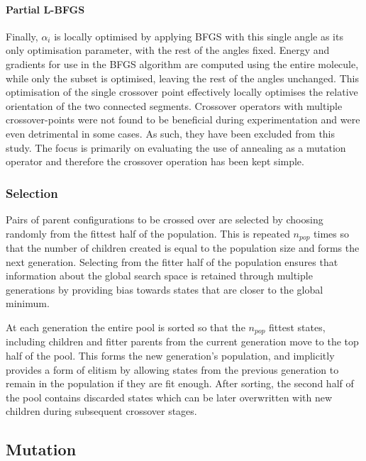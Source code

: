 \documentclass{article}
\begin{document}
\paragraph{Partial L-BFGS}

Finally, $\alpha_i$ is locally optimised by applying BFGS with this single angle
as its only optimisation parameter, with the rest of the angles fixed. Energy
and gradients for use in the BFGS algorithm are computed using the entire
molecule, while only the subset is optimised, leaving the rest of the angles
unchanged. This optimisation of the single crossover point effectively locally
optimises the relative orientation of the two connected segments.
Crossover operators with multiple crossover-points were not found to be
beneficial during experimentation and were even detrimental in some cases. As
such, they have been excluded from this study. The focus is primarily on
evaluating the use of annealing as a mutation operator and therefore the
crossover operation has been kept simple.

\subsubsection{Selection}

Pairs of parent configurations to be crossed over are selected by choosing
randomly from the fittest half of the population. This is repeated $n_{pop}$
times so that the number of children created is equal to the population size and
forms the next generation. Selecting from the fitter half of the population
ensures that information about the global search space is retained through
multiple generations by providing bias towards states that are closer to the
global minimum.

At each generation the entire pool is sorted so that the $n_{pop}$ fittest
states, including children and fitter parents from the current generation move
to the top half of the pool. This forms the new generation's population, and
implicitly provides a form of elitism by allowing states from the previous
generation to remain in the population if they are fit enough. After sorting,
the second half of the pool contains discarded states which can be later
overwritten with new children during subsequent crossover stages.

\subsection{Mutation}
\end{document}
